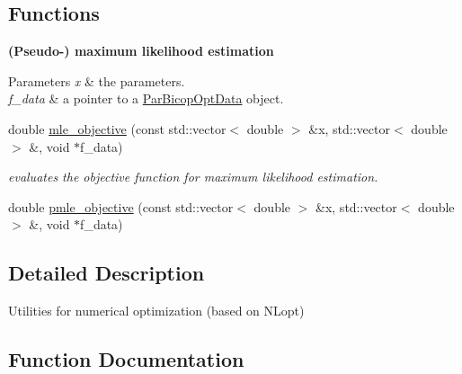 \subsection*{Functions}
\begin{Indent}{\bf (Pseudo-\/) maximum likelihood estimation}\par
{\em 
\begin{DoxyParams}{Parameters}
{\em x} & the parameters. \\
\hline
{\em f\+\_\+data} & a pointer to a \hyperlink{structvinecopulib_1_1tools__optimization_1_1_par_bicop_opt_data}{Par\+Bicop\+Opt\+Data} object. \\
\hline
\end{DoxyParams}
}\begin{DoxyCompactItemize}
\item 
double \hyperlink{namespacevinecopulib_1_1tools__optimization_ad3d35a53b2b9ca0f1c1ad5068eccaca7}{mle\+\_\+objective} (const std\+::vector$<$ double $>$ \&x, std\+::vector$<$ double $>$ \&, void $\ast$f\+\_\+data)\hypertarget{namespacevinecopulib_1_1tools__optimization_ad3d35a53b2b9ca0f1c1ad5068eccaca7}{}\label{namespacevinecopulib_1_1tools__optimization_ad3d35a53b2b9ca0f1c1ad5068eccaca7}

\begin{DoxyCompactList}\small\item\em evaluates the objective function for maximum likelihood estimation. \end{DoxyCompactList}\item 
double \hyperlink{namespacevinecopulib_1_1tools__optimization_a8e87f5c5ee5463aded9dfa45e6c0d3f0}{pmle\+\_\+objective} (const std\+::vector$<$ double $>$ \&x, std\+::vector$<$ double $>$ \&, void $\ast$f\+\_\+data)
\end{DoxyCompactItemize}
\end{Indent}


\subsection{Detailed Description}
Utilities for numerical optimization (based on N\+Lopt) 

\subsection{Function Documentation}
